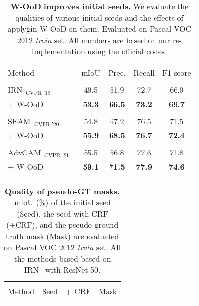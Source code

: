\documentclass[10pt,twocolumn,letterpaper]{article}
\begin{document}
\begin{table}[tbp]
\renewcommand{\arraystretch}{0.92}
  \centering
  \caption{\textbf{W-OoD improves initial seeds.} We evaluate the qualities of various initial seeds and the effects of applygin W-OoD on them. 
Evaluated on Pascal VOC 2012 \textit{train} set. All numbers are based on our re-implementation using the official codes.}
  \vspace{-0.7em}
    \begin{tabular}{l@{\hskip 0.07in}cc@{\hskip 0.12in}c@{\hskip 0.07in}c}
     \Xhline{1pt}\\[-0.95em]
    Method  & mIoU  & Prec. & Recall & F1-score \\
    \hline\hline \\[-0.9em]
    $\text{IRN}_{\text{~~CVPR '19}}$~\cite{ahn2018learning} & 49.5  & 61.9 & 72.7  & 66.9\\
    + W-OoD  & \textbf{53.3}  & \textbf{66.5} & \textbf{73.2} & \textbf{69.7}  \\
    \hline \\[-0.9em]
    $\text{SEAM}_{\text{~~CVPR '20}}$~\cite{wang2020self} &  54.8 & 67.2 & 76.5 &  71.5 \\
    + W-OoD  & \textbf{55.9} & \textbf{68.5} & \textbf{76.7} &   \textbf{72.4} \\
    \hline \\[-0.9em]
    $\text{AdvCAM}_{\text{~~CVPR '21}}$~\cite{lee2021anti} & 55.5  & 66.8 & 77.6 & 71.8  \\
    + W-OoD  & \textbf{59.1} & \textbf{71.5} & \textbf{77.9} & \textbf{74.6}  \\
\Xhline{1pt}
    \vspace{-1.8em}
    \end{tabular}\label{seed_improve}\end{table} \begin{table}[tbp]
\renewcommand{\arraystretch}{0.95}
  \centering
  \caption{\textbf{Quality of pseudo-GT masks.} mIoU (\%) of the initial seed (Seed), the seed with CRF (+CRF), and the pseudo ground truth mask (Mask) are evaluated on Pascal VOC 2012 \textit{train} set. All the methods based based on IRN~\cite{ahn2019weakly} with ResNet-50.}
  \vspace{-0.7em}
    \begin{tabular}{l@{\hskip 0.3in}c@{\hskip 0.1in}c@{\hskip 0.08in}c}
     \Xhline{1pt}\\[-0.95em]
    Method  &  Seed  & + CRF & Mask \\
    \hline\hline \\[-0.9em]



\end{tabular}
\end{table}
\end{document}
